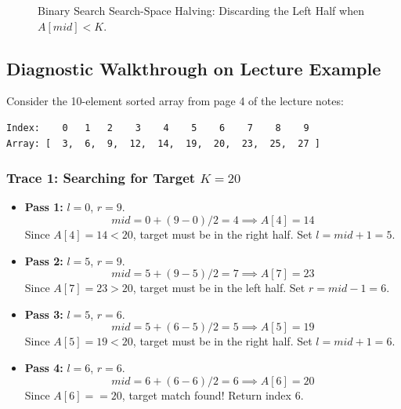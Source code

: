 \documentclass[10pt,journal,compsoc,onecolumn]{IEEEtran}
\begin{document}
\begin{figure}[h]
\centering
{}
\caption{Binary Search Search-Space Halving: Discarding the Left Half when $A[mid] < K$.}
\label{fig:bs_halving}
\end{figure}

\subsection{Diagnostic Walkthrough on Lecture Example}

Consider the 10-element sorted array from page 4 of the lecture notes:
\begin{verbatim}
Index:    0   1   2    3    4    5    6    7    8    9
Array: [  3,  6,  9,  12,  14,  19,  20,  23,  25,  27 ]
\end{verbatim}

\subsubsection{Trace 1: Searching for Target $K = 20$}
\begin{itemize}
    \item \textbf{Pass 1:} $l = 0$, $r = 9$.
    \[
    mid = 0 + (9 - 0) / 2 = 4 \implies A[4] = 14
    \]
    Since $A[4] = 14 < 20$, target must be in the right half. Set $l = mid + 1 = 5$.
    \item \textbf{Pass 2:} $l = 5$, $r = 9$.
    \[
    mid = 5 + (9 - 5) / 2 = 7 \implies A[7] = 23
    \]
    Since $A[7] = 23 > 20$, target must be in the left half. Set $r = mid - 1 = 6$.
    \item \textbf{Pass 3:} $l = 5$, $r = 6$.
    \[
    mid = 5 + (6 - 5) / 2 = 5 \implies A[5] = 19
    \]
    Since $A[5] = 19 < 20$, target must be in the right half. Set $l = mid + 1 = 6$.
    \item \textbf{Pass 4:} $l = 6$, $r = 6$.
    \[
    mid = 6 + (6 - 6) / 2 = 6 \implies A[6] = 20
    \]
    Since $A[6] == 20$, target match found! Return index $6$.
\end{itemize}
\end{document}
